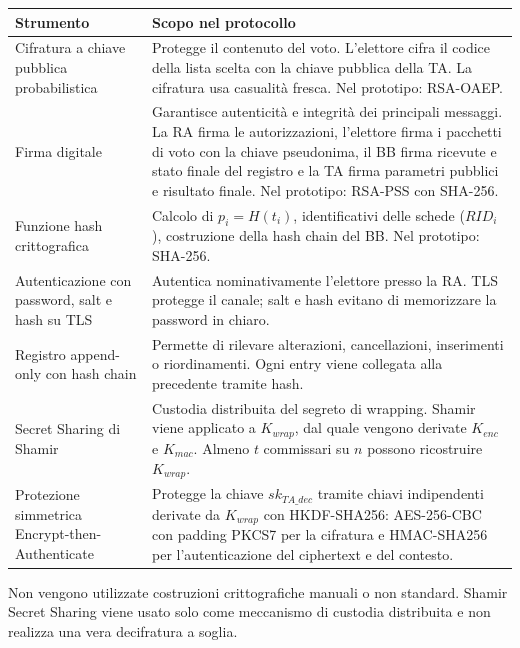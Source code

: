 \documentclass[12pt,a4paper]{article}
\newcommand{\sk}{\mathit{sk}}
\begin{document}
\begin{small}
\begin{longtable}{>{\raggedright}p{3.8cm} p{9.2cm}}
\toprule
\textbf{Strumento} & \textbf{Scopo nel protocollo} \\
\midrule
\endhead
Cifratura a chiave pubblica probabilistica &
Protegge il contenuto del voto. L'elettore cifra il codice della lista scelta con la chiave pubblica della TA. La cifratura usa casualit\`a fresca. Nel prototipo: RSA-OAEP. \\
\midrule
Firma digitale &
Garantisce autenticit\`a e integrit\`a dei principali messaggi. La RA firma le autorizzazioni, l'elettore firma i pacchetti di voto con la chiave pseudonima, il BB firma ricevute e stato finale del registro e la TA firma parametri pubblici e risultato finale. Nel prototipo: RSA-PSS con SHA-256. \\
\midrule
Funzione hash crittografica &
Calcolo di $p_i = H(t_i)$, identificativi delle schede ($\mathit{RID}_i$), costruzione della hash chain del BB. Nel prototipo: SHA-256. \\
\midrule
Autenticazione con password, salt e hash su TLS &
Autentica nominativamente l'elettore presso la RA. TLS protegge il canale; salt e hash evitano di memorizzare la password in chiaro. \\
\midrule
Registro append-only con hash chain &
Permette di rilevare alterazioni, cancellazioni, inserimenti o riordinamenti. Ogni entry viene collegata alla precedente tramite hash. \\
\midrule
Secret Sharing di Shamir &
Custodia distribuita del segreto di wrapping. Shamir viene applicato a $K_{\mathit{wrap}}$, dal quale vengono derivate $K_{\mathit{enc}}$ e $K_{\mathit{mac}}$. Almeno $t$ commissari su $n$ possono ricostruire $K_{\mathit{wrap}}$. \\
\midrule
Protezione simmetrica Encrypt-then-Authenticate &
Protegge la chiave $\sk_{\mathit{TA\_dec}}$ tramite chiavi indipendenti derivate da $K_{\mathit{wrap}}$ con HKDF-SHA256: AES-256-CBC con padding PKCS7 per la cifratura e HMAC-SHA256 per l'autenticazione del ciphertext e del contesto. \\
\bottomrule
\end{longtable}
\end{small}

Non vengono utilizzate costruzioni crittografiche manuali o non standard. Shamir Secret Sharing viene usato solo come meccanismo di custodia distribuita e non realizza una vera decifratura a soglia.
\end{document}
